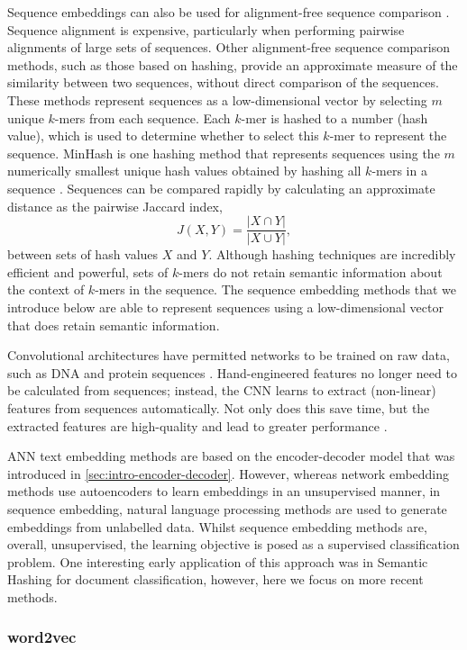 Sequence embeddings can also be used for alignment-free sequence comparison \cite{Ren2018}. Sequence alignment is expensive, particularly when performing pairwise alignments of large sets of sequences. Other alignment-free sequence comparison methods, such as those based on hashing, provide an approximate measure of the similarity between two sequences, without direct comparison of the sequences. These methods represent sequences as a low-dimensional vector by selecting $m$ unique $k$-mers from each sequence. Each $k$-mer is hashed to a number (hash value), which is used to determine whether to select this $k$-mer to represent the sequence. MinHash is one hashing method that represents sequences using the $m$ numerically smallest unique hash values obtained by hashing all $k$-mers in a sequence \cite{Ondov2016,Buhler2001,Luo2019,Steinegger2018}. Sequences can be compared rapidly by calculating an approximate distance as the pairwise Jaccard index,
\[
J(X,Y) = \frac{|X \cap Y|}{|X \cup Y|},
\]
between sets of hash values $X$ and $Y$. Although hashing techniques are incredibly efficient and powerful, sets of $k$-mers do not retain semantic information about the context of $k$-mers in the sequence. The sequence embedding methods that we introduce below are able to represent sequences using a low-dimensional vector that does retain semantic information.

Convolutional architectures have permitted networks to be trained on raw data, such as DNA and protein sequences \cite{Angermueller2016}. Hand-engineered features no longer need to be calculated from sequences; instead, the CNN learns to extract (non-linear) features from sequences automatically. Not only does this save time, but the extracted features are high-quality and lead to greater performance \cite{Angermueller2016}.

ANN text embedding methods are based on the encoder-decoder model that was introduced in \ref{sec:intro-encoder-decoder}. However, whereas network embedding methods use autoencoders to learn embeddings in an unsupervised manner, in sequence embedding, natural language processing methods are used to generate embeddings from unlabelled data. Whilst sequence embedding methods are, overall, unsupervised, the learning objective is posed as a supervised classification problem. One interesting early application of this approach was in Semantic Hashing \cite{Salakhutdinov2009} for document classification, however, here we focus on more recent methods.

\subsubsection{word2vec}

